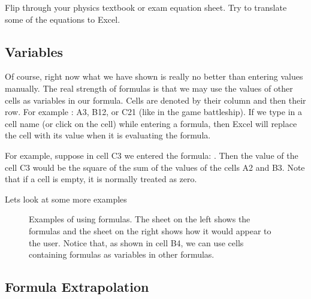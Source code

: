 \documentclass[10pt]{article}
\begin{document}
\begin{exercise}
	Flip through your physics textbook or exam equation sheet. Try to translate some of the equations to Excel. 
\end{exercise}

\subsection{Variables}%
\label{sub:variables}

Of course, right now what we have shown is really no better than entering values manually. The real strength of formulas is that we may use the values of other cells as variables in our formula. Cells are denoted by their column and then their row. For example : A3, B12, or C21 (like in the game battleship). If we type in a cell name (or click on the cell) while entering a formula, then Excel will replace the cell with its value when it is evaluating the formula.

For example, suppose in cell C3 we entered the formula: . Then the value of the cell C3 would be the square of the sum of the values of the cells A2 and B3. Note that if a cell is empty, it is normally treated as zero.

Lets look at some more examples

\begin{figure}[htpb]
	\centering
\begin{minipage}{0.4\textwidth}
	\begin{sheetpic}
	\end{sheetpic}
\end{minipage}
\begin{minipage}{0.4\textwidth}
	\begin{sheetpic}
		\etab[5]{A-B}
		\celtxt[c]{A}{1}{3}
		\celtxt[c]{A}{2}{6}
		\celtxt[c]{B}{4}{39}
	\end{sheetpic}
\end{minipage}
	\caption{Examples of using formulas. The sheet on the left shows the formulas and the sheet on the right shows how it would appear to the user. Notice that, as shown in cell B4, we can use cells containing formulas as variables in other formulas.}%
	\label{fig:forumula_example_1}
\end{figure}

\subsection{Formula Extrapolation}%
\label{sub:formula_extrapolation}
\end{document}
